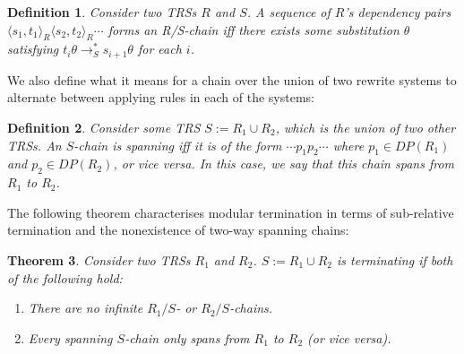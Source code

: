 \documentclass{article}
\newtheorem{theorem}{Theorem}[section]
\newtheorem{definition}[theorem]{Definition}
\newcommand{\dpair}[2]{\langle #1, #2 \rangle}
\begin{document}
\begin{definition}
    Consider two TRSs $R$ and $S$. A sequence of $R$'s dependency pairs $\dpair{s_1}{t_1}_R \dpair{s_2}{t_2}_R \cdots$ forms an \emph{R/S-chain} iff there exists some substitution $\theta$ satisfying $t_i \theta \rightarrow^*_S s_{i+1}\theta$ for each $i$. 
\end{definition}

We also define what it means for a chain over the union of two rewrite systems to alternate between applying rules in each of the systems:
\begin{definition}
    Consider some TRS $S := R_1 \cup R_2$, which is the union of two other TRSs. An $S$-chain is \emph{spanning} iff it is of the form $\cdots p_1 p_2 \cdots$ where $p_1 \in DP(R_1)$ and $p_2 \in DP(R_2)$, or vice versa. In this case, we say that this chain spans \emph{from} $R_1$ \emph{to} $R_2$.
\end{definition}
The following theorem characterises modular termination in terms of sub-relative termination and the nonexistence of two-way spanning chains:
\begin{theorem} \label{thm:mod_span_term}
    Consider two TRSs $R_1$ and $R_2$. $S := R_1 \cup R_2$ is terminating if both of the following hold: \begin{enumerate}
        \item There are no infinite $R_1/S$- or $R_2/S$-chains. \label{cond:no_r_chains}
        \item Every spanning $S$-chain only spans from $R_1$ to $R_2$ (or vice versa). \label{cond:no_span_chains}
    \end{enumerate}
\end{theorem}
\end{document}
